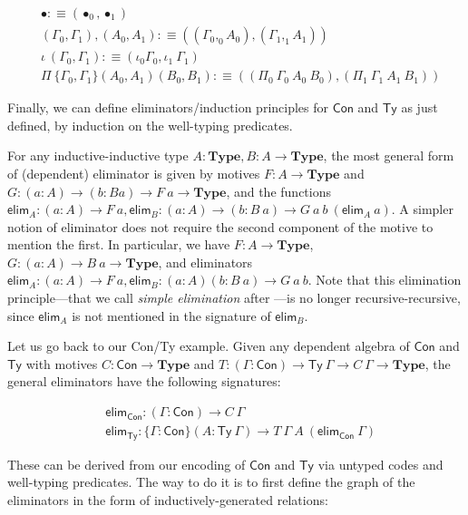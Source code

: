 \documentclass{easychair}
\newcommand{\GG}{\Gamma}
\newcommand{\mType}{\mathbf{Type}}
\begin{document}
\begin{align*}
  & \bullet :\equiv (\bullet_0 , \bullet_1) \\
  & (\GG_0 , \GG_1) , (A_0 , A_1) :\equiv ((\GG_0 ,_0 A_0) , (\GG_1 ,_1 A_1)) \\
  & \iota\ (\GG_0 , \GG_1) :\equiv (\iota_0 \GG_0 , \iota_1\ \GG_1) \\
  & \Pi\ \{\GG_0 , \GG_1\}(A_0 , A_1) (B_0 , B_1) :\equiv
    ((\Pi_0\ \GG_0\ A_0\ B_0) , (\Pi_1\ \GG_1\ A_1\ B_1))
\end{align*}

Finally, we can define eliminators/induction principles for $\textsf{Con}$ and
$\textsf{Ty}$ as just defined, by induction on the well-typing predicates.

For any inductive-inductive type $A : \mType, B: A \to \mType$, the most general
form of (dependent) eliminator is given by motives $F : A \to \mType$ and $G :
(a : A) \to (b : B a) \to F\ a \to \mType$, and the functions $\textsf{elim}_A :
(a : A) \to F\ a, \textsf{elim}_B : (a : A) \to (b : B\ a) \to
G\ a\ b\ (\textsf{elim}_A\ a)$. A simpler notion of eliminator does not require
the second component of the motive to mention the first. In particular, we have
$F : A \to \mType$, $G : (a : A) \to B\ a \to \mType$, and eliminators
$\textsf{elim}_A : (a : A) \to F\ a, \textsf{elim}_B : (a : A) (b : B\ a) \to
G\ a\ b$. Note that this elimination principle---that we call \emph{simple
  elimination} after \cite{ii}---is no longer recursive-recursive, since
$\textsf{elim}_A$ is not mentioned in the signature of $\textsf{elim}_B$.

Let us go back to our \textsf{Con}/\textsf{Ty} example. Given any dependent
algebra of $\textsf{Con}$ and $\textsf{Ty}$ with motives $C : \textsf{Con} \to
\mType$ and $T : (\GG : \textsf{Con}) \to \textsf{Ty}\ \GG \to C\ \GG \to
\mType$, the general eliminators have the following signatures:

\begin{align*}
  & \textsf{elim}_{\textsf{Con}} : (\GG : \textsf{Con}) \to C\ \GG \\
  & \textsf{elim}_{\textsf{Ty}} : \{\GG : \textsf{Con}\} (A : \textsf{Ty}\ \GG)
  \to T\ \GG\ A\ (\textsf{elim}_{\textsf{Con}}\ \GG)
\end{align*}

These can be derived from our encoding of $\textsf{Con}$ and $\textsf{Ty}$ via
untyped codes and well-typing predicates. The way to do it is to first define
the graph of the eliminators in the form of inductively-generated relations:
\end{document}
